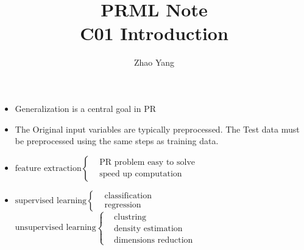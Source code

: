 \documentclass[UTF8]{article}
\title{PRML Note\\C01 Introduction}
\author{Zhao Yang}
\affil{Department of Automation, Tsinghua Unversity}
\date{}
\begin{document}
    \maketitle
    \begin{itemize}
        \item Generalization is a central goal in PR
        \item The Original input variables are typically
        preprocessed. The Test data must be preprocessed
        using the same steps as training data.
        \item  $\text{feature extraction}
        \begin{cases}
        &\text{PR problem easy to solve}\\
        &\text{speed up computation}
        \end{cases}$
        \item  $\text{supervised learning}
        \begin{cases}
        &\text{classification}\\
        &\text{regression}
        \end{cases}$\\
        $\text{unsupervised learning}
        \begin{cases}
        &\text{clustring}\\
        &\text{density estimation}\\
        &\text{dimensions reduction}
        \end{cases}$
    \end{itemize}
\end{document}
